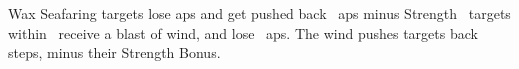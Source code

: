 
  {\mAir}%
  {Wax}%
  {\duplicated}%
  {Seafaring}%
  {targets lose  \glspl{ap} and get pushed back ~\glspl{ap} minus Strength}%
  {
    \spellArea\ targets within \spellRange\ receive a blast of wind, and lose ~\glspl{ap}.
    The wind pushes targets back  steps, minus their Strength Bonus.
  }
